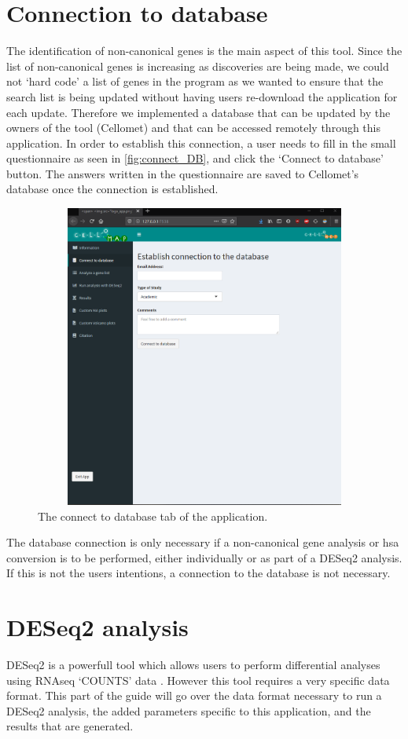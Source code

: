 \documentclass[11pt]{article}
\begin{document}
\section{Connection to database}
The identification of non-canonical genes is the main aspect of this tool. Since the list of non-canonical genes is increasing as discoveries are being made, we could not `hard code' a list of genes in the program as we wanted to ensure that the search list is being updated without having users re-download the application for each update. Therefore we implemented a database that can be updated by the owners of the tool (Cellomet) and that can be accessed remotely through this application.
In order to establish this connection, a user needs to fill in the small questionnaire as seen in \autoref{fig:connect_DB}, and click the `Connect to database' button. The answers written in the questionnaire are saved to Cellomet's database once the connection is established.

\begin{figure}[h!]
\centering
\includegraphics[width=15cm,height=10cm,keepaspectratio]{connect_DB.png}
\caption{The connect to database tab of the application.}
\label{fig:connect_DB}
\end{figure}

The database connection is only necessary if a non-canonical gene analysis or \acrshort{hsa} conversion is to be performed, either individually or as part of a \acrshort{DESeq2} analysis. If this is not the users intentions, a connection to the database is not necessary.

\section{DESeq2 analysis}
\acrshort{DESeq2} is a powerfull tool which allows users to perform differential analyses using RNAseq `COUNTS' data \cite{love2014moderated}. However this tool requires a very specific data format. This part of the guide will go over the data format necessary to run a \acrshort{DESeq2} analysis, the added parameters specific to this application, and the results that are generated.
\end{document}
